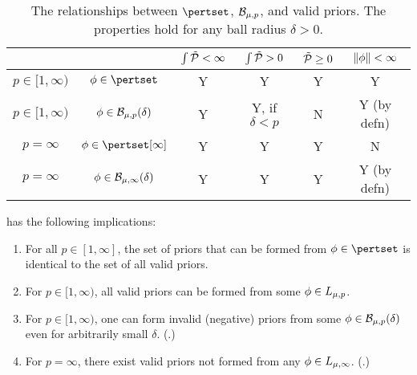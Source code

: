 \begin{thm}
\begin{table}[h!]
\begin{centering}
\begin{tabular}{cccccc}
    && $\int \tilde{\mathcal{P}} < \infty$
    & $\int \tilde{\mathcal{P}} > 0$
    & $\tilde{\mathcal{P}} \ge 0$
    & $\left\Vert\phi\right\Vert < \infty$\\[0.5em] \hline
$p \in [1, \infty)$   &     $\phi \in \pertset$ &
    Y & Y & Y & Y \\ \hline
$p \in [1, \infty)$   &     $\phi \in \mathcal{B}_{\mu,p}(\delta)$ &
    Y & Y, if $\delta < p$ & N & Y (by defn) \\ \hline
$p = \infty$   &     $\phi \in \pertset[\infty]$ &
    Y & Y & Y & N \\ \hline
$p = \infty$   &     $\phi \in \mathcal{B}_{\mu,\infty}(\delta)$ &
    Y & Y & Y & Y (by defn) \\ \hline
\end{tabular}
\caption{The relationships between $\pertset$, $\mathcal{B}_{\mu,p}$, and valid priors.
The properties hold for any ball radius $\delta > 0$.}
\end{centering}
\end{table}

 has the following implications:

\begin{enumerate}
%
\item {}
For all $p \in [1, \infty]$, the set of priors that can be formed from
$\phi \in \pertset$ is identical to the set of all valid priors.
%
\item {}
For $p \in [1, \infty)$, all valid priors can be formed from
some $\phi \in {L_{\mu,p}}$.
%
\item {}
For $p \in [1, \infty)$, one can form invalid (negative) priors from
some $\phi \in \mathcal{B}_{\mu,p}(\delta)$ even for arbitrarily small $\delta$.
(.)
%
\item {}
For $p = \infty$, there exist valid priors not formed from any
$\phi \in {L_{\mu,\infty}}$.  (.)
%
\end{enumerate}

%
\end{thm}

